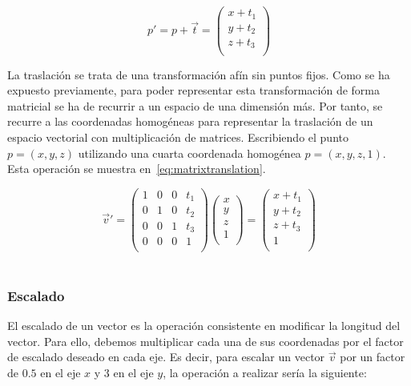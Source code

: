 \begin{equation}
	\label{eq:translation}
	p' = p + \overrightarrow{t} = 
	\left( \begin{array}{c}
			x + t_1 \\
			y + t_2 \\
			z + t_3 \\
	\end{array} \right)
\end{equation}

La traslación se trata de una transformación afín sin puntos fijos. Como se ha
expuesto previamente, para poder representar esta transformación de forma
matricial se ha de recurrir a un espacio de una dimensión más. Por tanto, se
recurre a las coordenadas homogéneas para representar la traslación de un
espacio vectorial con multiplicación de matrices. Escribiendo el punto $p =
(x,y,z)$ utilizando una cuarta coordenada homogénea $p = (x,y,z,1)$. Esta
operación se muestra en~\eqref{eq:matrixtranslation}. 

\begin{equation}
	\label{eq:matrixtranslation}
	\overrightarrow{v}' = 
	\left( \begin{array}{cccc}
			1 & 0 & 0 & t_1 \\
			0 & 1 & 0 & t_2 \\
			0 & 0 & 1 & t_3 \\
			0 & 0 & 0 & 1 \\
	\end{array} \right)
	\left( \begin{array}{c}
			x \\
			y \\
			z \\
			1 \\
	\end{array} \right) = 
	\left( \begin{array}{c}
			x + t_1 \\
			y + t_2 \\
			z + t_3 \\
			1 \\
	\end{array} \right)
\end{equation}\\

\subsubsection{Escalado}
\label{makereference5.4.1.2}

El escalado de un vector es la operación consistente en modificar la longitud
del vector. Para ello, debemos multiplicar cada una de sus coordenadas por el
factor de escalado deseado en cada eje. Es decir, para escalar un vector
$\overrightarrow{v}$ por un factor de $0.5$ en el eje $x$ y $3$ en el eje $y$,
la operación a realizar sería la siguiente:

